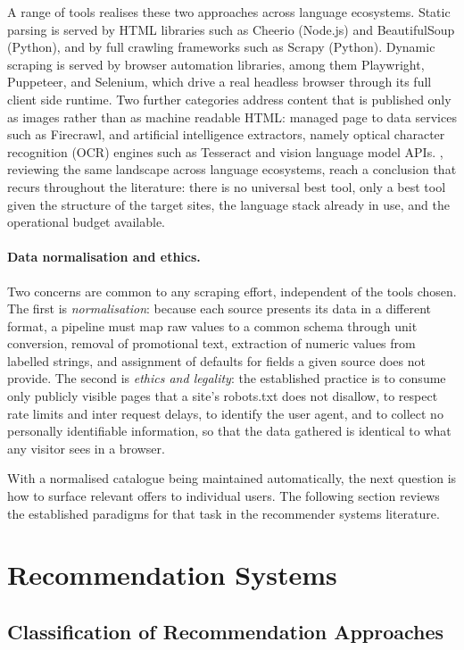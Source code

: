 A range of tools realises these two approaches across language ecosystems. Static parsing is served by HTML libraries such as Cheerio (Node.js) and BeautifulSoup (Python), and by full crawling frameworks such as Scrapy (Python). Dynamic scraping is served by browser automation libraries, among them Playwright, Puppeteer, and Selenium, which drive a real headless browser through its full client side runtime. Two further categories address content that is published only as images rather than as machine readable HTML: managed page to data services such as Firecrawl, and artificial intelligence extractors, namely optical character recognition (OCR) engines such as Tesseract and vision language model APIs. \textcite{GlezPena2014}, reviewing the same landscape across language ecosystems, reach a conclusion that recurs throughout the literature: there is no universal best tool, only a best tool given the structure of the target sites, the language stack already in use, and the operational budget available.

\paragraph{Data normalisation and ethics.}
Two concerns are common to any scraping effort, independent of the tools chosen. The first is \emph{normalisation}: because each source presents its data in a different format, a pipeline must map raw values to a common schema through unit conversion, removal of promotional text, extraction of numeric values from labelled strings, and assignment of defaults for fields a given source does not provide. The second is \emph{ethics and legality}: the established practice is to consume only publicly visible pages that a site's robots.txt does not disallow, to respect rate limits and inter request delays, to identify the user agent, and to collect no personally identifiable information, so that the data gathered is identical to what any visitor sees in a browser.

With a normalised catalogue being maintained automatically, the next question is how to surface relevant offers to individual users. The following section reviews the established paradigms for that task in the recommender systems literature.

\section{Recommendation Systems}

\subsection{Classification of Recommendation Approaches}

